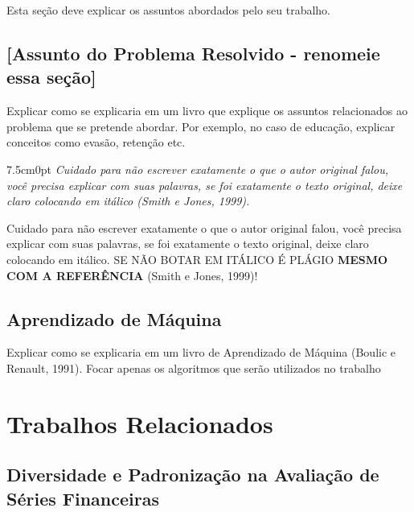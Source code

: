 \documentclass[12pt,a4paper]{article}
\begin{document}
Esta seção deve explicar os assuntos abordados pelo seu trabalho.

\subsection{[Assunto do Problema Resolvido - renomeie essa seção]}%
  \label{sec:assunto-problema}

Explicar como se explicaria em um livro que explique os assuntos relacionados ao
problema que se pretende abordar. Por exemplo, no caso de educação, explicar
conceitos como evasão, retenção etc.

\begin{adjustwidth}{7.5cm}{0pt}
\itshape
Cuidado para não escrever exatamente o que o autor original falou, você precisa
explicar com suas palavras, se foi exatamente o texto original, deixe claro
colocando em itálico (Smith e Jones, 1999).
\end{adjustwidth}

Cuidado para não escrever exatamente o que o autor original falou, você precisa
explicar com suas palavras, se foi exatamente o texto original, deixe claro
colocando em itálico. SE NÃO BOTAR EM ITÁLICO É PLÁGIO \textbf{MESMO COM A
REFERÊNCIA} (Smith e Jones, 1999)!

\subsection{Aprendizado de Máquina}\label{sec:aprendizado-maquina}

Explicar como se explicaria em um livro de Aprendizado de Máquina (Boulic e
Renault, 1991). Focar apenas os algoritmos que serão utilizados no trabalho

\section{Trabalhos Relacionados}\label{sec:trabalhos-relacionados}

\subsection{Diversidade e Padronização na Avaliação de Séries Financeiras}\label{sec:tr-padronizacao}
\end{document}
